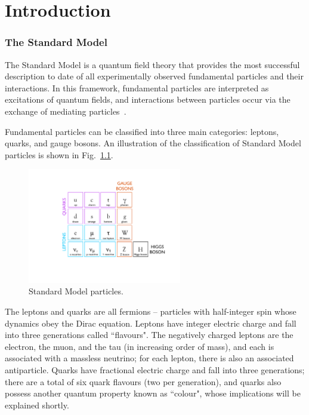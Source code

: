 \chapter{Introduction\label{sec:intro}}



\subsection{The Standard Model\label{sec:SM}}

The Standard Model is a quantum field theory that provides the most successful description to date of all experimentally observed fundamental particles and their interactions. In this framework, fundamental particles are interpreted as excitations of quantum fields, and interactions between particles occur via the exchange of mediating particles~\cite{BettiniPhysics}.

Fundamental particles can be classified into three main categories: leptons, quarks, and gauge bosons. An illustration of the classification of Standard Model particles is shown in Fig.~\ref{fig:StandardModelTable}.

\begin{figure}
   \begin{center}
      \includegraphics[width=0.6\textwidth]{figures/StandardModelTable}
      \caption{Standard Model particles.}
      \label{fig:StandardModelTable}
   \end{center}
\end{figure}

The leptons and quarks are all fermions -- particles with half-integer spin whose dynamics obey the Dirac equation. Leptons have integer electric charge and fall into three generations called ``flavours". The negatively charged leptons are the electron, the muon, and the tau (in increasing order of mass), and each is associated with a massless neutrino; for each lepton, there is also an associated antiparticle. Quarks have fractional electric charge and fall into three generations; there are a total of six quark flavours (two per generation), and quarks also possess another quantum property known as ``colour", whose implications will be explained shortly.

